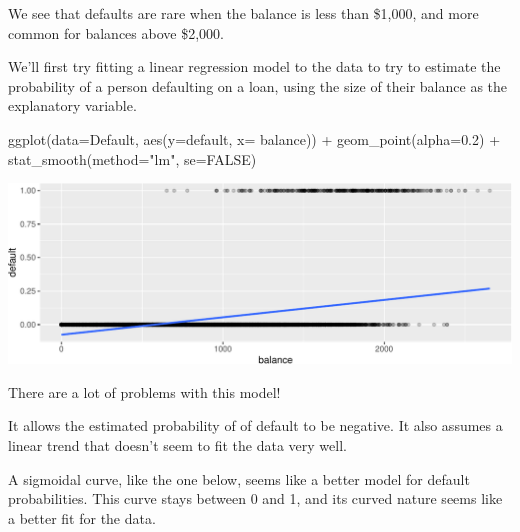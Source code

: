 \documentclass[
  letterpaper,
  DIV=11,
  numbers=noendperiod]{scrreprt}
\newenvironment{Shaded}{\begin{snugshade}}{\end{snugshade}}
\newcommand{\AttributeTok}[1]{\textcolor[rgb]{0.40,0.45,0.13}{#1}}
\newcommand{\CommentTok}[1]{\textcolor[rgb]{0.37,0.37,0.37}{#1}}
\newcommand{\ConstantTok}[1]{\textcolor[rgb]{0.56,0.35,0.01}{#1}}
\newcommand{\FloatTok}[1]{\textcolor[rgb]{0.68,0.00,0.00}{#1}}
\newcommand{\FunctionTok}[1]{\textcolor[rgb]{0.28,0.35,0.67}{#1}}
\newcommand{\NormalTok}[1]{\textcolor[rgb]{0.00,0.23,0.31}{#1}}
\newcommand{\OtherTok}[1]{\textcolor[rgb]{0.00,0.23,0.31}{#1}}
\newcommand{\SpecialCharTok}[1]{\textcolor[rgb]{0.37,0.37,0.37}{#1}}
\newcommand{\StringTok}[1]{\textcolor[rgb]{0.13,0.47,0.30}{#1}}
\begin{document}
We see that defaults are rare when the balance is less than \$1,000, and
more common for balances above \$2,000.

We'll first try fitting a linear regression model to the data to try to
estimate the probability of a person defaulting on a loan, using the
size of their balance as the explanatory variable.

\begin{Shaded}
\end{Shaded}

\begin{Shaded}
\begin{Highlighting}[]
\FunctionTok{ggplot}\NormalTok{(}\AttributeTok{data=}\NormalTok{Default, }\FunctionTok{aes}\NormalTok{(}\AttributeTok{y=}\NormalTok{default, }\AttributeTok{x=}\NormalTok{ balance)) }\SpecialCharTok{+} \FunctionTok{geom\_point}\NormalTok{(}\AttributeTok{alpha=}\FloatTok{0.2}\NormalTok{)  }\SpecialCharTok{+} \FunctionTok{stat\_smooth}\NormalTok{(}\AttributeTok{method=}\StringTok{"lm"}\NormalTok{, }\AttributeTok{se=}\ConstantTok{FALSE}\NormalTok{)}
\end{Highlighting}
\end{Shaded}

\includegraphics{Ch6_files/figure-pdf/unnamed-chunk-6-1.pdf}

There are a lot of problems with this model!

It allows the estimated probability of of default to be negative. It
also assumes a linear trend that doesn't seem to fit the data very well.

A sigmoidal curve, like the one below, seems like a better model for
default probabilities. This curve stays between 0 and 1, and its curved
nature seems like a better fit for the data.
\end{document}
